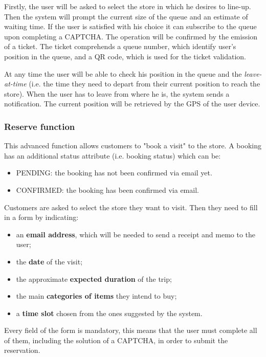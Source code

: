 	Firstly, the user will be asked to select the store in which he desires to line-up.\newline
	Then the system will prompt the current size of the queue and an estimate of waiting time. If the user is satisfied with his choice it can subscribe to the queue upon completing a CAPTCHA. The operation will be confirmed by the emission of a ticket. The ticket comprehends a queue number, which identify user's position in the queue, and a QR code, which is used for the ticket validation.
	
	At any time the user will be able to check his position in the queue and the \textit{leave-at-time} (i.e. the time they need to depart from their current position to reach the store). When the user has to leave from where he is, the system sends a notification. The current position will be retrieved by the GPS of the user device.

	\subsubsection{Reserve function}
	This advanced function allows customers to "book a visit" to the store.
	A booking has an additional status attribute (i.e. booking status) which can be:
	\begin{itemize}
		\item PENDING: the booking has not been confirmed via email yet.
		\item CONFIRMED: the booking has been confirmed via email.
	\end{itemize}

	Customers are asked to select the store they want to visit. Then they need to fill in a form by indicating:
	\begin{itemize}
		\item an \textbf{email address}, which will be needed to send a receipt and memo to the user;
		\item the \textbf{date} of the visit;
		\item the approximate \textbf{expected duration} of the trip;
	 	\item the main \textbf{categories of items} they intend to buy;
	    \item a \textbf{time slot} chosen from the ones suggested by the system.
	\end{itemize}
	Every field of the form is mandatory, this means that the user must complete all of them, including the solution of a CAPTCHA, in order to submit the reservation.
	
